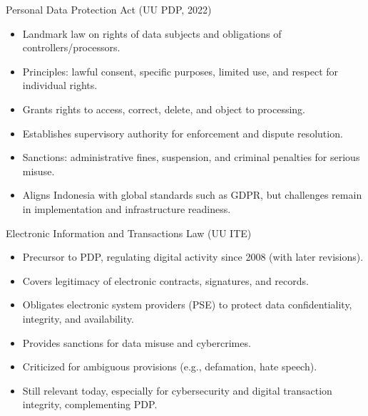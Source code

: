 \documentclass[aspectratio=169, table]{beamer}
\begin{document}
\begin{frame}{Personal Data Protection Act (UU PDP, 2022)}
	\vspace{20pt}
	\begin{itemize}
		\item Landmark law on rights of data subjects and obligations of controllers/processors.  
		\item Principles: lawful consent, specific purposes, limited use, and respect for individual rights.  
		\item Grants rights to access, correct, delete, and object to processing.  
		\item Establishes supervisory authority for enforcement and dispute resolution.  
		\item Sanctions: administrative fines, suspension, and criminal penalties for serious misuse.  
		\item Aligns Indonesia with global standards such as GDPR, but challenges remain in implementation and infrastructure readiness.  
	\end{itemize}
\end{frame}

\begin{frame}{\LARGE{Electronic Information and Transactions Law (UU ITE)}}
	\vspace{20pt}
	\begin{itemize}
		\item Precursor to PDP, regulating digital activity since 2008 (with later revisions).  
		\item Covers legitimacy of electronic contracts, signatures, and records.  
		\item Obligates electronic system providers (PSE) to protect data confidentiality, integrity, and availability.  
		\item Provides sanctions for data misuse and cybercrimes.  
		\item Criticized for ambiguous provisions (e.g., defamation, hate speech).  
		\item Still relevant today, especially for cybersecurity and digital transaction integrity, complementing PDP.  
	\end{itemize}
\end{frame}
\end{document}
